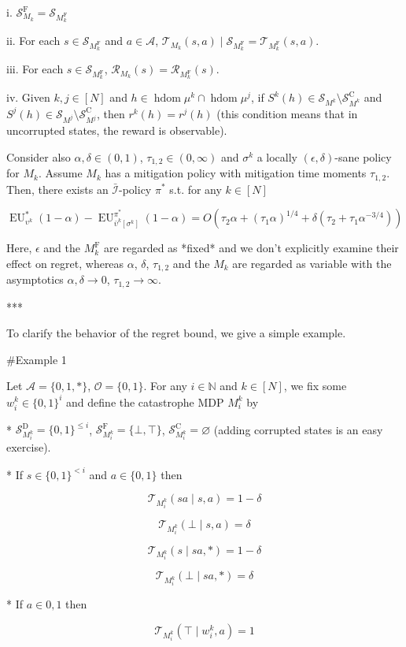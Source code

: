 \documentclass[a4paper]{article}
\newcommand{\Bool}{\{0,1\}}
\newcommand{\AP}[1]{\left(#1\right)}
\newcommand{\AB}[1]{\left[#1\right]}
\newcommand{\Nats}{\mathbb{N}}
\newcommand{\Ob}{\mathcal{O}}
\newcommand{\A}{\mathcal{A}}
\newcommand{\St}{\mathcal{S}}
\newcommand{\T}{\mathcal{T}}
\newcommand{\R}{\mathcal{R}}
\newcommand{\In}{\mathcal{I}}
\newcommand{\Adi}{{\bar{\In}}}
\DeclareMathOperator{\HD}{hdom}
\newcommand{\SF}{\St^{\text{F}}}
\newcommand{\SD}{\St^{\text{D}}}
\newcommand{\SC}{\St^{\text{C}}}
\newcommand{\MF}{M^{\text{F}}}
\newcommand{\EU}{\operatorname{EU}}
\begin{document}
i. $\SF_{M_k} = \St_{\MF_k}$

ii. For each $s \in \St_{\MF_k}$ and $a \in \A$, $\T_{M_k}(s,a) \mid \St_{\MF_k} = \T_{\MF_k}(s,a)$.

iii. For each $s \in \St_{\MF_k}$, $\R_{M_k}(s)=\R_{\MF_k}(s)$.

iv. Given $k,j \in [N]$ and $h \in \HD{\mu^k} \cap \HD{\mu^j}$, if $S^k(h) \in \St_{M^k} \setminus \SC_{M^k}$ and $S^j(h) \in \St_{M^j} \setminus \SC_{M^j}$, then $r^k(h)=r^j(h)$ (this condition means that in uncorrupted states, the reward is observable).

Consider also $\alpha,\delta\in(0,1)$, $\tau_{1,2} \in (0,\infty)$ and $\sigma^k$ a locally $(\epsilon,\delta)$-sane policy for $M_k$. Assume $M_k$ has a mitigation policy with mitigation time moments $\tau_{1,2}$. Then, there exists an $\Adi$-policy $\pi^*$ s.t. for any $k \in [N]$

$$\EU_{\upsilon^k}^*(1-\alpha) - \EU_{\bar{\upsilon}^k\AB{\sigma^k}}^{\pi^*}(1-\alpha) = O\AP{\tau_2 \alpha + (\tau_1 \alpha)^{1/4} + \delta \AP{\tau_2 + \tau_1 \alpha^{-3/4}}}$$

Here, $\epsilon$ and the $\MF_k$ are regarded as *fixed* and we don't explicitly examine their effect on regret, whereas $\alpha$, $\delta$, $\tau_{1,2}$ and the $M_k$ are regarded as variable with the asymptotics $\alpha,\delta \rightarrow 0$, $\tau_{1,2} \rightarrow \infty$.

***

To clarify the behavior of the regret bound, we give a simple example.

\#Example 1

Let $\A = \{0,1,*\}$, $\Ob=\Bool$. For any $i \in \Nats$ and $k \in [N]$, we fix some $w_i^k \in \Bool^i$ and define the catastrophe MDP $M_i^k$ by

* $\SD_{M_i^k} = \Bool^{\leq i}$, $\SF_{M_i^k} = \{\bot,\top\}$, $\SC_{M_i^k} = \varnothing$ (adding corrupted states is an easy exercise).

* If $s \in \Bool^{< i}$ and $a \in \Bool$ then 

$$\T_{M_i^k}(sa \mid s,a) = 1 - \delta$$

$$\T_{M_i^k}(\bot \mid s,a) = \delta$$

$$\T_{M_i^k}(s \mid sa,*) = 1 - \delta$$

$$\T_{M_i^k}(\bot \mid sa,*) = \delta$$

* If $a \in {0,1}$ then

$$\T_{M_i^k}(\top \mid w_i^k,a) = 1$$
\end{document}
